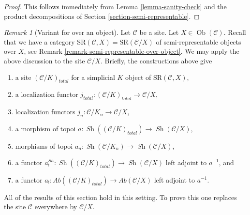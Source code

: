 \documentclass[10pt,a4paper]{amsart}
\theoremstyle{plain}
\theoremstyle{definition}
\theoremstyle{remark}
\newtheorem{remark}[subsection]{Remark}
\numberwithin{equation}{subsection}
\def\Ob{\mathop{\mathrm{Ob}}\nolimits}
\def\Sh{\mathop{\mathit{Sh}}\nolimits}
\begin{document}
\begin{proof}
This follows immediately from Lemma \ref{lemma-sanity-check}
and the product decompositions of Section \ref{section-semi-representable}.
\end{proof}

\begin{remark}[Variant for over an object]
\label{remark-augmentation-over-object}
Let $\mathcal{C}$ be a site. Let $X \in \Ob(\mathcal{C})$.
Recall that we have a category
$\text{SR}(\mathcal{C}, X) = \text{SR}(\mathcal{C}/X)$
of semi-representable objects over $X$,
see Remark \ref{remark-semi-representable-over-object}.
We may apply the above discussion to the site
$\mathcal{C}/X$. Briefly, the constructions above give
\begin{enumerate}
\item a site $(\mathcal{C}/K)_{total}$ for a simplicial $K$ object
of $\text{SR}(\mathcal{C}, X)$,
\item a localization functor
$j_{total} : (\mathcal{C}/K)_{total} \to \mathcal{C}/X$,
\item localization functors $j_n : \mathcal{C}/K_n \to \mathcal{C}/X$,
\item a morphism of topoi
$a : \Sh((\mathcal{C}/K)_{total}) \to \Sh(\mathcal{C}/X)$,
\item morphisms of topoi
$a_n : \Sh(\mathcal{C}/K_n) \to \Sh(\mathcal{C}/X)$,
\item a functor
$a^{Sh}_! : \Sh((\mathcal{C}/K)_{total}) \to \Sh(\mathcal{C}/X)$
left adjoint to $a^{-1}$, and
\item a functor
$a_! : \textit{Ab}((\mathcal{C}/K)_{total}) \to \textit{Ab}(\mathcal{C}/X)$
left adjoint to $a^{-1}$.
\end{enumerate}
All of the results of this section hold in this setting.
To prove this one replaces
the site $\mathcal{C}$ everywhere by $\mathcal{C}/X$.
\end{remark}
\end{document}
